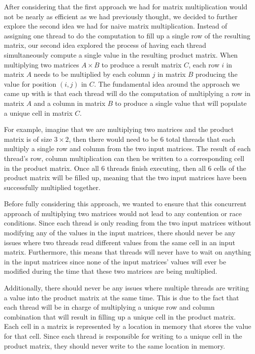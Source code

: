 \documentclass[conference,leqno]{IEEEtran}
\begin{document}
After considering that the first approach we had for matrix multiplication would not be nearly as efficient as we had previously thought, we decided to further explore the second idea we had for naive matrix multiplication. Instead of assigning one thread to do the computation to fill up a single row of the resulting matrix, our second idea explored the process of having each thread simultaneously compute a single value in the resulting product matrix. When multiplying two matrices $A \times B$ to produce a result matrix $C$, each row $i$ in matrix $A$ needs to be multiplied by each column $j$ in matrix $B$ producing the value for position $(i, j)$ in $C$. The fundamental idea around the approach we came up with is that each thread will do the computation of multiplying a row in matrix $A$ and a column in matrix $B$ to produce a single value that will populate a unique cell in matrix $C$.

For example, imagine that we are multiplying two matrices and the product matrix is of size $3 \times 2$, then there would need to be $6$ total threads that each multiply a single row and column from the two input matrices. The result of each thread’s row, column multiplication can then be written to a corresponding cell in the product matrix. Once all $6$ threads finish executing, then all $6$ cells of the product matrix will be filled up, meaning that the two input matrices have been successfully multiplied together.

Before fully considering this approach, we wanted to ensure that this concurrent approach of multiplying two matrices would not lead to any contention or race conditions. Since each thread is only reading from the two input matrices without modifying any of the values in the input matrices, there should never be any issues where two threads read different values from the same cell in an input matrix. Furthermore, this means that threads will never have to wait on anything in the input matrices since none of the input matrices’ values will ever be modified during the time that these two matrices are being multiplied.

Additionally, there should never be any issues where multiple threads are writing a value into the product matrix at the same time. This is due to the fact that each thread will be in charge of multiplying a unique row and column combination that will result in filling up a unique cell in the product matrix. Each cell in a matrix is represented by a location in memory that stores the value for that cell. Since each thread is responsible for writing to a unique cell in the product matrix, they should never write to the same location in memory.
\end{document}
